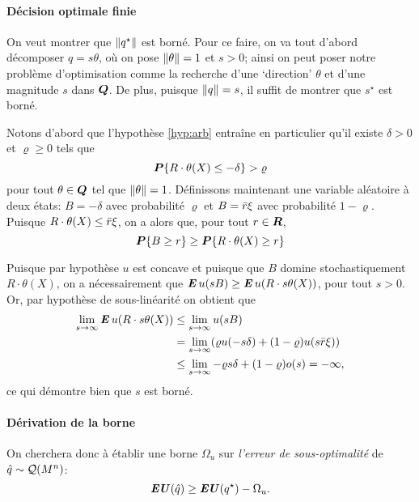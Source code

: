 \paragraph{Décision optimale finie}

  On veut montrer que $\|q^\star\|$ est borné. Pour ce faire, on va tout d'abord décomposer
  $q = s\theta$, où on pose $\|\theta\|=1$ et $s>0$; ainsi on peut poser notre problème
  d'optimisation comme la recherche d'une `direction' $\theta$ et d'une magnitude $s$ dans
  $\bm Q$. De plus, puisque $\|q\| = s$, il suffit de montrer que $s^\star$ est borné.

  Notons d'abord que l'hypothèse \ref{hyp:arb} entraîne en particulier qu'il existe
  $\delta > 0$ et $\varrho \geq 0$ tels que
  \begin{equation}
    \bm P\{R\cdot \theta(X) \leq -\delta\} > \varrho
  \end{equation}
  pour tout $\theta \in \bm Q$ tel que $\|\theta\| = 1$. Définissons maintenant une variable aléatoire à
  deux états: $B = -\delta$ avec probabilité $\varrho$ et $B = \bar r\xi$ avec probabilité
  $1-\varrho$. Puisque $R\cdot \theta(X) \leq \bar r\xi$, on a alors que, pour tout $r \in \bm{R}$,
  \begin{equation}
    \bm P\{B\geq r\} \geq \bm P\{R\cdot \theta(X)\geq r\}
  \end{equation}

  Puisque par hypothèse $u$ est concave et puisque que $B$ domine stochastiquement
  $R\cdot \theta(X)$, on a nécessairement que $\operatorname{\mbox{\textbf{\textit{E}}}} u(sB) \geq \operatorname{\mbox{\textbf{\textit{E}}}} u(R\cdot s\theta(X))$, pour tout
  $s > 0$. Or, par hypothèse de sous-linéarité on obtient que
  \begin{align}
    \lim_{s\to\infty}\operatorname{\mbox{\textbf{\textit{E}}}} u(R\cdot s\theta(X)) &\leq \lim_{s\to\infty}u(sB)\\
                             & = \lim_{s\to\infty}(\varrho u(-s\delta) + (1-\varrho)u(s\bar r\xi))\\
                             & \leq\lim_{s\to\infty}-\varrho s \delta + (1-\varrho)o(s) = -\infty,
  \end{align}
  ce qui démontre bien que $s$ est borné.

\paragraph{Dérivation de la borne}

On cherchera donc à établir une borne $\Omega_u$ sur \textit{l'erreur de sous-optimalité} de
$\hat q \sim \mathcal{Q}(M^n)$:
\begin{equation}
  \operatorname{\mbox{\textbf{\textit{EU}}}}(\hat q) \geq \operatorname{\mbox{\textbf{\textit{EU}}}}(q^\star) - \Omega_u.
\end{equation}

